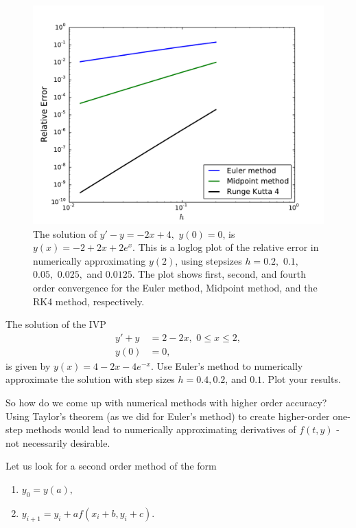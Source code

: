 \begin{figure}[ht]
\centering
\includegraphics[width=\textwidth]{Fig3.pdf}
\caption{The solution of $y' -y= -2x+4,$ $ y(0) = 0$, is $y(x) = -2+2x + 2e^x.$ This is a loglog plot of the relative error in numerically approximating $y(2)$, using stepsizes $h = 0.2,$ $0.1,$ $0.05,$ $0.025,$ and $0.0125$. The plot shows first, second, and fourth order convergence for the Euler method, Midpoint method, and the RK4 method, respectively.}
\label{ivp:relative_error}
\end{figure}


\begin{problem} The solution of the IVP
\begin{align*}
y' + y &= 2-2x,\,\, 0 \leq x \leq 2, \\
y(0) &= 0,
\end{align*}
is given by $y(x) = 4-2x -4e^{-x}$. 
Use Euler's method to numerically approximate the solution with step sizes $h = 0.4, 0.2$, and $0.1.$ Plot your results.
\end{problem}


So how do we come up with numerical methods with higher order accuracy? Using Taylor's theorem (as we did for Euler's method) to create higher-order one-step methods would lead to numerically approximating derivatives of $f(t,y)$ - not necessarily desirable. 

Let us look for a second order method of the form 
\begin{enumerate}
\item $y_0 = y(a),$
\item $y_{i+1} = y_i + a f(x_i+b, y_i+c).$
\end{enumerate}


